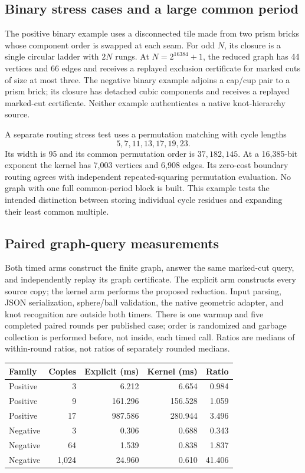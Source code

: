 \documentclass[11pt]{article}
\theoremstyle{remark}\newtheorem{remark}[theorem]{Remark}
\begin{document}
\subsection{Binary stress cases and a large common period}
The positive binary example uses a disconnected tile made from two prism bricks whose component order is swapped at each seam. For odd $N$, its closure is a single circular ladder with $2N$ rungs. At $N=2^{16384}+1$, the reduced graph has 44 vertices and 66 edges and receives a replayed exclusion certificate for marked cuts of size at most three. The negative binary example adjoins a cap/cup pair to a prism brick; its closure has detached cubic components and receives a replayed marked-cut certificate. Neither example authenticates a native knot-hierarchy source.

A separate routing stress test uses a permutation matching with cycle lengths
\[
 5,7,11,13,17,19,23.
\]
Its width is 95 and its common permutation order is $37{,}182{,}145$. At a 16,385-bit exponent the kernel has 7,003 vertices and 6,908 edges. Its zero-cost boundary routing agrees with independent repeated-squaring permutation evaluation. No graph with one full common-period block is built. This example tests the intended distinction between storing individual cycle residues and expanding their least common multiple.

\subsection{Paired graph-query measurements}
Both timed arms construct the finite graph, answer the same marked-cut query, and independently replay its graph certificate. The explicit arm constructs every source copy; the kernel arm performs the proposed reduction. Input parsing, JSON serialization, sphere/ball validation, the native geometric adapter, and knot recognition are outside both timers. There is one warmup and five completed paired rounds per published case; order is randomized and garbage collection is performed before, not inside, each timed call. Ratios are medians of within-round ratios, not ratios of separately rounded medians.

\begin{center}
\begin{tabular}{lrrrr}
\toprule
Family & Copies & Explicit (ms) & Kernel (ms) & Ratio\\
\midrule
Positive & 3 & 6.212 & 6.654 & 0.984\\
Positive & 9 & 161.296 & 156.528 & 1.059\\
Positive & 17 & 987.586 & 280.944 & 3.496\\
Negative & 3 & 0.306 & 0.688 & 0.343\\
Negative & 64 & 1.539 & 0.838 & 1.837\\
Negative & 1,024 & 24.960 & 0.610 & 41.406\\
\bottomrule
\end{tabular}
\end{center}
\end{document}
